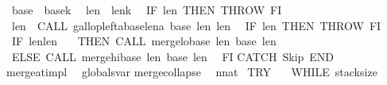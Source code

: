 \begin{isabellebody}
\ \ {\isasymacute}base{}\ {\isacharcolon}{\isacharequal}{\isacharequal}\ {\isasymacute}base{}{\isacharplus}{\isasymacute}k{\isacharsemicolon}{\isacharsemicolon}\isanewline
\ \ {\isasymacute}len{}\ {\isacharcolon}{\isacharequal}{\isacharequal}\ {\isasymacute}len{}{\isacharminus}{\isasymacute}k{\isacharsemicolon}{\isacharsemicolon}\isanewline
\ \ IF\ {\isasymacute}len{}{\isacharequal}{}\ THEN\ THROW\ FI{\isacharsemicolon}{\isacharsemicolon}\isanewline
\ \ {\isasymacute}len{}\ {\isacharcolon}{\isacharequal}{\isacharequal}\ CALL\ gallop{\isacharunderscore}left{\isacharparenleft}{\isasymacute}a{\isacharbang}{\isacharparenleft}{\isasymacute}base{}{\isacharplus}{\isasymacute}len{}{\isacharminus}{}{\isacharparenright}{\isacharcomma}{\isasymacute}a{\isacharcomma}\ {\isasymacute}base{}{\isacharcomma}\ {\isasymacute}len{}{\isacharcomma}\ {\isasymacute}len{}{\isacharminus}{}{\isacharparenright}{\isacharsemicolon}{\isacharsemicolon}\isanewline
\ \ IF\ {\isasymacute}len{}{\isacharequal}{}\ THEN\ THROW\ FI{\isacharsemicolon}{\isacharsemicolon}\isanewline
\ \ IF\ {\isacharparenleft}{\isasymacute}len{}{\isasymle}{\isasymacute}len{}{\isacharparenright}\ \isanewline
\ \ THEN\ CALL\ merge{\isacharunderscore}lo{\isacharparenleft}{\isasymacute}base{}{\isacharcomma}\ {\isasymacute}len{}{\isacharcomma}\ {\isasymacute}base{}{\isacharcomma}\ {\isasymacute}len{}{\isacharparenright}\isanewline
\ \ ELSE\ CALL\ merge{\isacharunderscore}hi{\isacharparenleft}{\isasymacute}base{}{\isacharcomma}\ {\isasymacute}len{}{\isacharcomma}\ {\isasymacute}base{}{\isacharcomma}\ {\isasymacute}len{}{\isacharparenright}\isanewline
\ \ FI\isanewline
CATCH\ Skip\ END\isanewline
{\isachardoublequoteclose}\isanewline
{}\isamarkupfalse%
\ merge{\isacharunderscore}at{\isacharunderscore}impl\isanewline
\isanewline
{}\isamarkupfalse%
\ {\isacharparenleft}\ globals{\isacharunderscore}var{\isacharparenright}\isanewline
merge{\isacharunderscore}collapse{\isacharparenleft}{\isacharparenright}\ \isanewline
{}\ n{\isacharcolon}{\isacharcolon}nat\ \isanewline
{\isachardoublequoteopen}TRY\ \isanewline
\ \ WHILE\ {\isasymacute}stack{\isacharunderscore}size\ {\isachargreater}\ {}\ \isanewline

\end{isabellebody}
